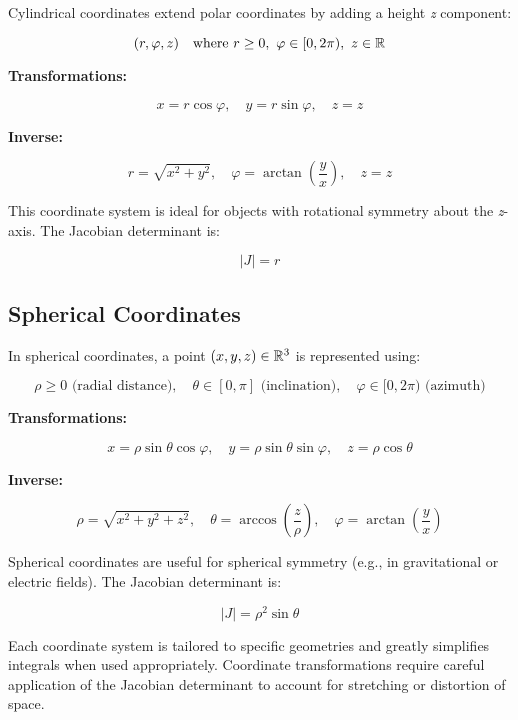 Cylindrical coordinates extend polar coordinates by adding a height \emph{z} component:

\[
    (r, \varphi, z) \quad \text{where } r \ge 0, \ \varphi \in [0, 2\pi), \ z \in \mathbb{R}
\]

\textbf{Transformations:}

\[
    x = r \cos \varphi, \quad y = r \sin \varphi, \quad z = z
\]

\textbf{Inverse:}

\[
    r = \sqrt{x^2 + y^2}, \quad \varphi = \arctan\left(\frac{y}{x}\right), \quad z = z
\]

This coordinate system is ideal for objects with rotational symmetry about the \emph{z}-axis. 
The Jacobian determinant is:

\[
    |J| = r
\]


\subsection{Spherical Coordinates}

In spherical coordinates, a point \( (x, y, z) \in \mathbb{R}^3 \) is represented using:

\[
    \rho \ge 0 \text{ (radial distance)}, \quad \theta \in [0, \pi] \text{ (inclination)}, \quad 
    \varphi \in [0, 2\pi) \text{ (azimuth)}
\]

\textbf{Transformations:}

\[
    x = \rho \sin \theta \cos \varphi, \quad y = \rho \sin \theta \sin \varphi, \quad z = \rho \cos 
    \theta
\]

\textbf{Inverse:}

\[
    \rho = \sqrt{x^2 + y^2 + z^2}, \quad \theta = \arccos\left(\frac{z}{\rho}\right), \quad 
    \varphi = \arctan\left(\frac{y}{x}\right)
\]

Spherical coordinates are useful for spherical symmetry (e.g., in gravitational or electric fields). 
The Jacobian determinant is:

\[
    |J| = \rho^2 \sin \theta
\]


Each coordinate system is tailored to specific geometries and greatly simplifies integrals when used 
appropriately. Coordinate transformations require careful application of the Jacobian 
determinant to account for stretching or distortion of space.




